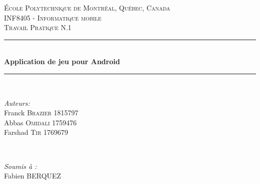\begin{titlepage}

\newcommand{\HRule}{\rule{\linewidth}{0.5mm}} %

\center %
 

\textsc{\LARGE  \'{E}cole Polytechnique de Montr\'{e}al, Qu\'{e}bec, Canada}\\[1.5cm] %
\textsc{\Large INF8405 - Informatique mobile
}\\[0.5cm] %
\textsc{\large Travail Pratique N.1}\\[0.5cm] %


\HRule \\[0.4cm]
{ \huge \bfseries Application de jeu pour Android}\\[0.4cm] %
\HRule \\[1.5cm]
 

\begin{minipage}{0.5\textwidth}
\begin{flushleft} \large
\emph{Auteurs:}\\
Franck \textsc{Brazier}  1815797\\ %
Abbas  \textsc{Omidali} 1759476\\ %
Farshad \textsc{Tir} 1769679 \\ %
\end{flushleft}
\end{minipage}
~
\begin{minipage}{0.4\textwidth}
\begin{flushright} \large
\emph{Soumis à :} \\
Fabien  \textsc{BERQUEZ} %
\end{flushright}
\end{minipage}\\[2cm]


\end{titlepage}
